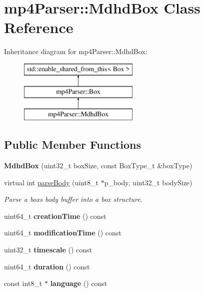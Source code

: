\hypertarget{classmp4_parser_1_1_mdhd_box}{}\section{mp4\+Parser\+::Mdhd\+Box Class Reference}
\label{classmp4_parser_1_1_mdhd_box}
Inheritance diagram for mp4\+Parser\+::Mdhd\+Box\+:\begin{figure}[H]
\begin{center}
\leavevmode
\includegraphics[height=3.000000cm]{classmp4_parser_1_1_mdhd_box}
\end{center}
\end{figure}
\subsection*{Public Member Functions}
\begin{DoxyCompactItemize}
\item 
\mbox{\label{classmp4_parser_1_1_mdhd_box_a9c282c87327e2918f29d84bd73e2cf16}} 
{\bfseries Mdhd\+Box} (uint32\+\_\+t box\+Size, const Box\+Type\+\_\+t \&box\+Type)
\item 
virtual int \mbox{\hyperlink{classmp4_parser_1_1_mdhd_box_a8168bb0096c340422ad97250aff16528}{parse\+Body}} (uint8\+\_\+t $\ast$p\+\_\+body, uint32\+\_\+t body\+Size)
\begin{DoxyCompactList}\small\item\em Parse a box\textquotesingle{}s body buffer into a box structure. \end{DoxyCompactList}\item 
\mbox{\label{classmp4_parser_1_1_mdhd_box_ab0a4892e91b8065a43c459e19cb50b65}} 
uint64\+\_\+t {\bfseries creation\+Time} () const
\item 
\mbox{\label{classmp4_parser_1_1_mdhd_box_ac386b77c346725721e907ea1bab57d48}} 
uint64\+\_\+t {\bfseries modification\+Time} () const
\item 
\mbox{\label{classmp4_parser_1_1_mdhd_box_a287e102170979fe78ac1f22af22098b6}} 
uint32\+\_\+t {\bfseries timescale} () const
\item 
\mbox{\label{classmp4_parser_1_1_mdhd_box_aa0692f6d7bd17b3bd5e8209419214b4c}} 
uint64\+\_\+t {\bfseries duration} () const
\item 
\mbox{\label{classmp4_parser_1_1_mdhd_box_a7e983de63e7948ed33ccc8660ff41ae5}} 
const int8\+\_\+t $\ast$ {\bfseries language} () const
\end{DoxyCompactItemize}
